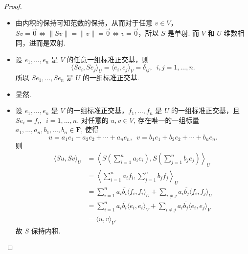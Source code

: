 \begin{proof}
    \begin{itemize}
        \item[\ref*{item:20:保积同构条件:1}$\implies$\ref*{item:20:保积同构条件:2}] 由内积的保持可知范数的保持，从而对于任意 $v\in V$，$ Sv=\vec{0} \iff \|Sv\|=\|v\|=\vec{0} \iff v=\vec{0}$，所以 $ S $ 是单射. 而 $ V $ 和 $ U $ 维数相同，进而是双射.

        \item[\ref*{item:20:保积同构条件:2}$\implies$\ref*{item:20:保积同构条件:3}] 设 $ e_1, \ldots , e_n $ 是 $ V $ 的任意一组标准正交基，则
        \[ \langle Se_i, Se_j \rangle_U = \langle e_i, e_j \rangle_V = \delta_{ij},\enspace i, j = 1, \ldots , n. \]
        所以 $ Se_1, \ldots , Se_n $ 是 $ U $ 的一组标准正交基.

        \item[\ref*{item:20:保积同构条件:3}$\implies$\ref*{item:20:保积同构条件:4}] 显然.

        \item[\ref*{item:20:保积同构条件:4}$\implies$\ref*{item:20:保积同构条件:1}] 设 $ e_1, \ldots , e_n $ 是 $ V $ 的一组标准正交基，$ f_1, \ldots , f_n $ 是 $ U $ 的一组标准正交基，且 $ Se_i = f_i,\enspace i = 1, \ldots , n $. 对任意的 $ u, v \in V $, 存在唯一的一组标量 $ a_1, \ldots , a_n, b_1, \ldots , b_n \in \mathbf{F} $, 使得
        \[ u = a_1e_1 + a_2e_2 + \cdots + a_ne_n, \enspace v = b_1e_1 + b_2e_2 + \cdots + b_ne_n. \]
        则
        \begin{align*}
            \langle Su, Sv \rangle_U & = \left\langle S\left(\sum_{i=1}^{n} a_ie_i\right), S\left(\sum_{j=1}^{n} b_je_j\right) \right\rangle_U    \\
                                & = \left\langle \sum_{i=1}^{n} a_if_i, \sum_{j=1}^{n} b_jf_j \right\rangle_U   \\
                                & = \sum_{i=1}^{n} a_i\overline{b_i} \langle f_i, f_i \rangle_U + \sum_{i \neq j} a_i\overline{b_j} \langle f_i, f_j \rangle_U \\
                                & = \sum_{i=1}^{n} a_i\overline{b_i} \langle e_i, e_i \rangle_V + \sum_{i \neq j} a_i\overline{b_j} \langle e_i, e_j \rangle_V \\
                                & = \langle u, v \rangle_V.
        \end{align*}
        故 $ S $ 保持内积.
    \end{itemize}
\end{proof}

